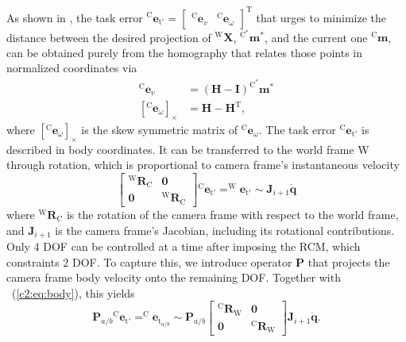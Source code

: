 As shown in \cite{benhimane2006homography}, the task error $^\text{C}\mathbf{e}_{\text{t}'} = \begin{bmatrix}^\text{C}\mathbf{e}_v & ^\text{C}\mathbf{e}_\omega\end{bmatrix}^\text{T}$ that urges to minimize the distance between the desired projection of $^\text{W}\mathbf{X}$, $^{\text{C}^*}\mathbf{m}^*$, and the current one $^\text{C}\mathbf{m}$, can be obtained purely from the homography that relates those points in normalized coordinates via
\begin{equation}
    \begin{split}
        ^\text{C}\mathbf{e}_v & = (\mathbf{H} - \mathbf{I})^{\text{C}^*}\mathbf{m}^*\\
        \left[^\text{C}\mathbf{e}_\omega\right]_\times & = \mathbf{H} - \mathbf{H}^\text{T},
    \end{split}
    \label{c2:eq:dc}
\end{equation}
where $\left[^\text{C}\mathbf{e}_\omega\right]_\times$ is the skew symmetric matrix of $^\text{C}\mathbf{e}_\omega$. The task error $^\text{C}\mathbf{e}_{\text{t}'}$ is described in body coordinates. It can be transferred to the world frame W through rotation, which is proportional to camera frame's instantaneous velocity
\begin{equation}
    \begin{bmatrix}^\text{W}\mathbf{R}_\text{C} & \mathbf{0} \\ \mathbf{0} & ^\text{W}\mathbf{R}_\text{C}\end{bmatrix}{^\text{C}\mathbf{e}_{\text{t}'}} = ^\text{W}\mathbf{e}_{\text{t}'} \sim \mathbf{J}_{i+1}\dot{\mathbf{q}}
    \label{c2:eq:body}
\end{equation}
where $^\text{W}\mathbf{R}_\text{C}$ is the rotation of the camera frame with respect to the world frame, and $\mathbf{J}_{i+1}$ is the camera frame's Jacobian, including its rotational contributions. Only 4 DOF can be controlled at a time after imposing the RCM, which constraints 2 DOF. To capture this, we introduce operator $\mathbf{P}$ that projects the camera frame body velocity onto the remaining DOF. Together with \ (\eqref{c2:eq:body}), this yields
\begin{equation}
    \mathbf{P}_{a/b}{^\text{C}\mathbf{e}_{\text{t}'}} = ^\text{C}\mathbf{e}_{\text{t}_{a/b}} \sim \mathbf{P}_{a/b} \begin{bmatrix}^\text{C}\mathbf{R}_\text{W} & \mathbf{0} \\ \mathbf{0} & ^\text{C}\mathbf{R}_\text{W}\end{bmatrix}\mathbf{J}_{i+1}\dot{\mathbf{q}}.
    \label{c2:eq:proj}
\end{equation}
